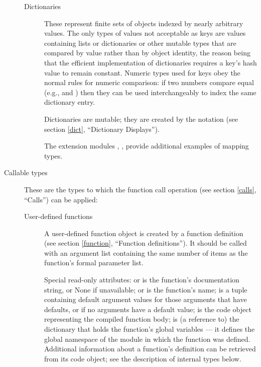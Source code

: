 \begin{description}
\begin{description}
\item[Dictionaries]
These represent finite sets of objects indexed by nearly arbitrary
values.  The only types of values not acceptable as keys are values
containing lists or dictionaries or other mutable types that are
compared by value rather than by object identity, the reason being
that the efficient implementation of dictionaries requires a key's
hash value to remain constant.
Numeric types used for keys obey the normal rules for numeric
comparison: if two numbers compare equal (e.g.,  and
) then they can be used interchangeably to index the same
dictionary entry.

Dictionaries are mutable; they are created by the 
notation (see section \ref{dict}, ``Dictionary Displays'').

The extension modules ,
, 
provide additional examples of mapping types.

\end{description} %

\item[Callable types]
These are the types to which the function call operation (see section
\ref{calls}, ``Calls'') can be applied:

\begin{description}

\item[User-defined functions]
A user-defined function object is created by a function definition
(see section \ref{function}, ``Function definitions'').  It should be
called with an argument
list containing the same number of items as the function's formal
parameter list.

Special read-only attributes:  or  is the
function's documentation string, or None if unavailable;
 or  is the function's name;
 is a tuple containing default argument values for
those arguments that have defaults, or  if no arguments
have a default value;  is the code object representing
the compiled function body;  is (a reference to)
the dictionary that holds the function's global variables --- it
defines the global namespace of the module in which the function was
defined.  Additional information about a function's definition can be
retrieved from its code object; see the description of internal types
below.


\end{description}
\end{description}
